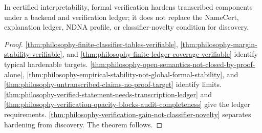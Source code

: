 \begin{theorem}
\label{thm:philosophy-formal-verification-certified-interpretability-theorem}
In certified interpretability, formal verification hardens transcribed
components under a backend and verification ledger; it does not replace
the NameCert, explanation ledger, NDNA profile, or classifier-novelty
condition for discovery.
\end{theorem}
\begin{proof}
\autoref{thm:philosophy-finite-classifier-tables-verifiable},
\autoref{thm:philosophy-margin-stability-verifiable}, and
\autoref{thm:philosophy-finite-ledger-coverage-verifiable} identify
typical hardenable targets.
\autoref{thm:philosophy-open-semantics-not-closed-by-proof-alone},
\autoref{thm:philosophy-empirical-stability-not-global-formal-stability},
and \autoref{thm:philosophy-untranscribed-claims-no-proof-target}
identify limits.
\autoref{thm:philosophy-verified-statement-needs-transcription-ledger}
and
\autoref{thm:philosophy-verification-opacity-blocks-audit-completeness}
give the ledger requirements.
\autoref{thm:philosophy-verification-gain-not-classifier-novelty}
separates hardening from discovery. The theorem follows.
\end{proof}

